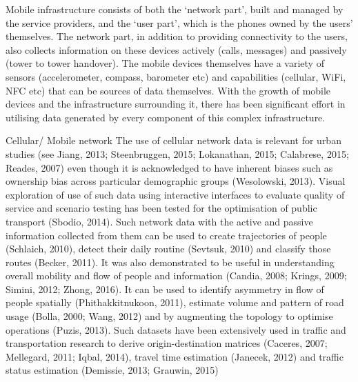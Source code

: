 Mobile infrastructure consists of both the ‘network part’, built and managed by
the service providers, and the ‘user part’, which is the phones owned by the
users’ themselves. The network part, in addition to providing connectivity to
the users, also collects information on these devices actively (calls, messages)
and passively (tower to tower handover). The mobile devices themselves have a
variety of sensors (accelerometer, compass, barometer etc) and capabilities
(cellular, WiFi, NFC etc) that can be sources of data themselves. With the
growth of mobile devices and the infrastructure surrounding it, there has been
significant effort in utilising data generated by every component of this
complex infrastructure.


Cellular/ Mobile network The use of cellular network data is relevant for urban
studies (see Jiang, 2013; Steenbruggen, 2015; Lokanathan, 2015; Calabrese, 2015;
Reades, 2007) even though it is acknowledged to have inherent biases such as
ownership bias across particular demographic groups (Wesolowski, 2013). Visual
exploration of use of such data using interactive interfaces to evaluate quality
of service and scenario testing has been tested for the optimisation of public
transport (Sbodio, 2014). Such network data with the active and passive
information collected from them can be used to create trajectories of people
(Schlaich, 2010), detect their daily routine (Sevtsuk, 2010) and classify those
routes (Becker, 2011). It was also demonstrated to be useful in understanding
overall mobility and flow of people and information (Candia, 2008; Krings, 2009;
Simini, 2012; Zhong, 2016). It can be used to identify asymmetry in flow of
people spatially (Phithakkitnukoon, 2011), estimate volume and pattern of road
usage (Bolla, 2000; Wang, 2012) and by augmenting the topology to optimise
operations (Puzis, 2013). Such datasets have been extensively used in traffic
and transportation research to derive origin-destination matrices (Caceres,
2007; Mellegard, 2011; Iqbal, 2014), travel time estimation (Janecek, 2012) and
traffic status estimation (Demissie, 2013; Grauwin, 2015)


